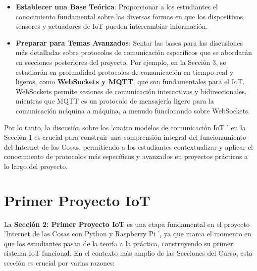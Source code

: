 \documentclass{report}
\begin{document}
\begin{itemize}
    \item \textbf{Establecer una Base Teórica}: Proporcionar a los estudiantes el conocimiento fundamental sobre las diversas formas en que los dispositivos, 
    sensores y actuadores de IoT pueden intercambiar información.
    \item \textbf{Preparar para Temas Avanzados}: Sentar las bases para las discusiones más detalladas sobre protocolos de comunicación específicos que se 
    abordarán en secciones posteriores del proyecto. Por ejemplo, en la Sección 3, se estudiarán en profundidad protocolos de comunicación en tiempo real y 
    ligeros, como \textbf{WebSockets y MQTT}, que son fundamentales para el IoT. WebSockets permite sesiones de comunicación interactivas y bidireccionales, 
    mientras que MQTT es un protocolo de mensajería ligero para la comunicación máquina a máquina, a menudo funcionando sobre WebSockets.
\end{itemize}
Por lo tanto, la discusión sobre los  'cuatro modelos de comunicación IoT ' en la Sección 1 es crucial para construir una comprensión integral del 
funcionamiento del Internet de las Cosas, permitiendo a los estudiantes contextualizar y aplicar el conocimiento de protocolos más específicos y avanzados 
en proyectos prácticos a lo largo del proyecto.

\section{Primer Proyecto IoT}
La \textbf{Sección 2: Primer Proyecto IoT} es una etapa fundamental en el proyecto  'Internet de las Cosas con Python y Raspberry Pi ', ya que marca el 
momento en que los estudiantes pasan de la teoría a la práctica, construyendo su primer sistema IoT funcional. En el contexto más amplio de las Secciones 
del Curso, esta sección es crucial por varias razones:
\end{document}
